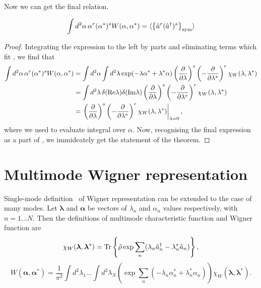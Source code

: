 Now we can get the final relation.
\begin{theorem}
\label{thm:multimode-formalism:single-mode-wigner-moments}
\[
	\int d^2\alpha\, \alpha^r (\alpha^*)^s W(\alpha, \alpha^*)
	= \langle \left\{  \hat{a}^r (\hat{a}^\dagger)^s  \right\}_{\mathrm{sym}} \rangle
\]
\end{theorem}
\begin{proof}
Integrating the expression to the left by parts and eliminating terms which fit , we find that
\begin{equation*}
\begin{split}
	\int d^2\alpha\, \alpha^r (\alpha^*)^s W(\alpha, \alpha^*)
	& = \int d^2\alpha \int d^2\lambda
		\exp(-\lambda \alpha^* + \lambda^* \alpha)
		\left( \frac{\partial}{\partial \lambda} \right)^s
		\left( -\frac{\partial}{\partial \lambda^*} \right)^r
		\chi_W (\lambda, \lambda^*) \\
	& = \int d^2\lambda\,
		\delta (\mathrm{Re} \lambda) \delta (\mathrm{Im} \lambda)
		\left( \frac{\partial}{\partial \lambda} \right)^s
		\left( -\frac{\partial}{\partial \lambda^*} \right)^r
		\chi_W (\lambda, \lambda^*) \\
	& = \left.
		\left( \frac{\partial}{\partial \lambda} \right)^s
		\left( -\frac{\partial}{\partial \lambda^*} \right)^r
		\chi_W (\lambda, \lambda^*)
	\right|_{\lambda=0},
\end{split}
\end{equation*}
where we used  to evaluate integral over $\alpha$.
Now, recognising the final expression as a part of ,
we immideately get the statement of the theorem.
\end{proof}

\section{Multimode Wigner representation}

Single-mode definition~ of Wigner representation can be extended to the case of many modes.
Let $\bm{\lambda}$ and $\bm{\alpha}$ be vectors of $\lambda_n$ and $\alpha_n$ values respectively,
with $n = 1 \ldots N$.
Then the definitions of multimode characteristic function and Wigner function are
\[
	\chi_W (\bm{\lambda}, \bm{\lambda}^*)
	= \mathrm{Tr} \left\{  \hat{\rho} \exp \sum\limits_n
		(\lambda_n \hat{a}_n^\dagger - \lambda_n^* \hat{a}_n)  \right\},
\]
\begin{equation}
\label{eqn:multimode-formalism:multimode-wigner}
	W (\bm{\alpha}, \bm{\alpha}^*)
	= \frac{1}{\pi^2} \int d^2 \lambda_1 \ldots \int d^2 \lambda_N
		\left(
			\exp \sum\limits_n (-\lambda_n \alpha_n^* + \lambda_n^* \alpha_n)
		\right)
		\chi_W (\bm{\lambda}, \bm{\lambda}^*).
\end{equation}

